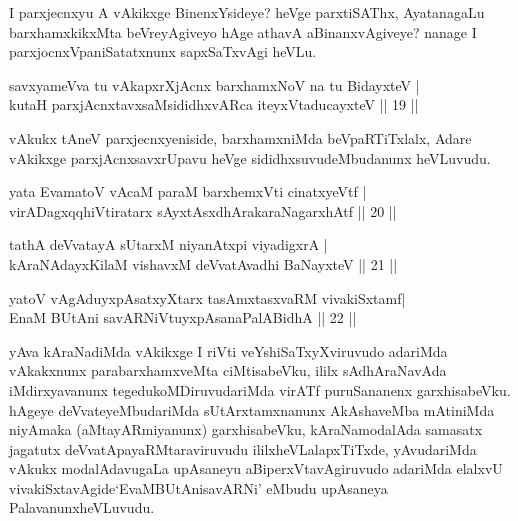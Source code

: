 \begin{artha}
I parxjecnxyu A vAkikxge BinenxYsideye? heVge parxtiSAThx, AyatanagaLu barxhamxkikxMta beVreyAgiveyo hAge athavA aBinanxvAgiveye? nanage I parxjocnxVpaniSatatxnunx sapxSaTxvAgi heVLu.
\end{artha}


\begin{shl}
savxyameVva tu vAkapxrXjAcnx barxhamxNoV na tu BidayxteV |\\
kutaH parxjAcnxtavxsaMsididhxvARca iteyxVtaducayxteV \hfill || 19 || 
\end{shl}

\begin{artha}
vAkukx tAneV parxjecnxyeniside, barxhamxniMda beVpaRTiTxlalx, Adare vAkikxge parxjAcnxsavxrUpavu heVge sididhxsuvudeMbudanunx heVLuvudu.
\end{artha}


\begin{shl}
yata EvamatoV vAcaM paraM barxhemxVti cinatxyeVtf |\\
virADagxqqhiVtiratarx sAyxtAsxdhArakaraNagarxhAtf \hfill || 20 || 
\end{shl}

\begin{shl}
tathA deVvatayA sUtarxM niyanAtx\s pi viyadigxrA |\\
kAraNAdayxKilaM vishavxM deVvatAvadhi BaNayxteV \hfill || 21 || 
\end{shl}

\begin{shl}
yatoV vAgAduyxpAsatxyXtarx tasAmxtasxvaRM vivakiSxtamf|\\
EnaM BUtAni savARNiVtuyxpAsanaPalABidhA \hfill || 22 || 
\end{shl}

\begin{artha}
yAva kAraNadiMda vAkikxge I riVti veYshiSaTxyXviruvudo adariMda vAkakxnunx parabarxhamxveMta ciMtisabeVku, ililx sAdhAraNavAda iMdirxya\-vanunx tegedukoMDiruvudariMda virATf puruSananenx garxhisabeVku. hAgeye deVvateyeMbudariMda sUtArxtamxnanunx AkAshaveMba mAtiniMda niyAmaka (aMtayARmiyanunx) garxhisabeVku, kAraNa\break modalAda samasatx jagatutx deVvatApayaRMtaraviruvudu ililx\break heVLalapxTiTxde, yAvudariMda vAkukx modalAdavugaLa upAsaneyu aBiperxVtavAgiruvudo adariMda elalxvU vivakiSxtavAgide\break `EvaMBUtAnisavARNi' eMbudu upAsaneya Palavanunx\break heVLuvudu.
\end{artha}

